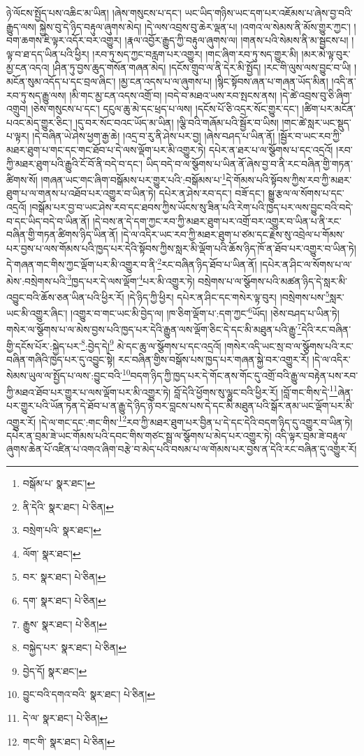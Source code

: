 ཉེ་ལོངས་སྤྱོད་པས་འཆིང་མ་ཡིན། །ཞེས་གསུངས་པ་དང་། ཡང་ཡིད་གཉིས་ཡང་དག་པར་འཇོམས་པ་ཞེས་བྱ་བའི་རྒྱུད་ལས། སྐྱེས་བུ་དེ་ཉིད་བརྟུལ་ཞུགས་མེད། །དེ་ལས་འབྲས་བུ་ཆེར་ལྡན་པ། །འགའ་ལ་སེམས་ནི་མོས་གྱུར་ཀྱང་། །བག་ཆགས་ཇི་ལྟར་འདོར་བར་འགྱུར། །རྣལ་འབྱོར་རྒྱུད་ཀྱི་བརྟུལ་ཞུགས་ལ། །གནས་པའི་སེམས་ནི་མ་སྦྱངས་པ། །ལྟ་བ་ཐ་དད་ཡིན་པའི་ཕྱིར། །རབ་ཏུ་སད་ཀྱང་བརླག་པར་འགྱུར། །གང་ཞིག་རབ་ཏུ་སད་གྱུར་མི། །མར་མེ་ལྟ་བུར་མྱ་ངན་འདའ། །ཤིན་ཏུ་བྱས་ཆུད་གསོན་གཞན་མེད། །དངོས་གྲུབ་ལ་ནི་དེར་མི་སྤྱོད། །རང་གི་ལུས་ལས་བྱུང་བ་ཡི། །མངོན་སུམ་འདོད་པ་དང་བྲལ་ཞིང་། །མྱ་ངན་འདས་པ་ལ་ཞུགས་པ། །སྙིང་སྟོབས་ཞན་པ་གཞན་ཡོད་མིན། །འདི་ན་རབ་ཏུ་སད་རྒྱུ་ལས། །མི་གང་མྱ་ངན་འདས་འགྲོ་བ། །བདེ་བ་མཐའ་ཡས་རབ་སྤངས་ནས། །དེ་ཚེ་འབྲས་བུ་ཅི་ཞིག་འགྲུབ། །ཅེས་གསུངས་པ་དང་། དངུལ་ཆུ་མེ་དང་ཕྲད་པ་ལས། །དངོས་པོ་ཅི་འདྲར་སོང་གྱུར་དང་། །ཚིག་པར་མངོན་པའང་མེད་གྱུར་ཅིང་། །དུ་བར་སོང་བའང་ཡོད་མ་ཡིན། །ལྕི་བའི་གཞོམ་པའི་སྦྱོར་བ་ཡིས། །གང་ཚེ་སླར་ཡང་སྡུད་པ་ལྟར། །དེ་བཞིན་ཡེ་ཤེས་ཕྱག་རྒྱ་ཆེ། །འདྲ་བ་རུ་ནི་ཤེས་པར་བྱ། །ཞེས་བཤད་པ་ཡིན་ནོ། །སྦྱོར་བ་ཡང་རབ་ཀྱི་མཐར་ཐུག་པ་གང་དང་གང་ཐོབ་པ་དེ་ལས་ལྡོག་པར་མི་འགྱུར་ཏེ། དཔེར་ན་ཐར་པ་ལ་སྩོགས་པ་དང་འདྲའོ། །རབ་ཀྱི་མཐར་ཐུག་པའི་རྒྱུའི་ངོ་བོ་ནི་བདེ་བ་དང་། ཡིད་བདེ་བ་ལ་སྩོགས་པ་ཡིན་ནོ་ཞེས་བྱ་བ་ནི་རང་བཞིན་གྱི་གཏན་ཚིགས་སོ། །གཞན་ཡང་གང་ཞིག་བསྒོམས་པར་གྱུར་པའི་:བསྒོམས་པ་\footnote{བསྒོམ་པ་  སྣར་ཐང་། }དེ་གོམས་པའི་སྟོབས་ཀྱིས་རབ་ཀྱི་མཐར་ཐུག་པ་ལ་གནས་པ་འཐོབ་པར་འགྱུར་བ་ཡིན་ཏེ། དཔེར་ན་ཤེས་རབ་དང་། བཟོ་དང་། སྒྱུ་རྩལ་ལ་སོགས་པ་དང་འདྲའོ། །བསྒོམ་པར་བྱ་བ་ཡང་ཤེས་རབ་དང་ཐབས་ཀྱིས་ཡོངས་སུ་ཟིན་པའི་རེག་པའི་ཁྱད་པར་ལས་བྱུང་བའི་བདེ་བ་དང་ཡིད་བདེ་བ་ཡིན་ནོ། །དེ་བས་ན་དེ་དག་ཀྱང་རབ་ཀྱི་མཐར་ཐུག་པར་འགྲོ་བར་འགྱུར་བ་ཡིན་པ་ནི་རང་བཞིན་གྱི་གཏན་ཚིགས་ཉིད་ཡིན་ནོ། །དེ་ལ་འདིར་ཡང་རབ་ཀྱི་མཐར་ཐུག་པ་ཙམ་དང་རྗེས་སུ་འབྲེལ་པ་གོམས་པར་བྱས་པ་ལས་གོམས་པའི་ཁྱད་པར་དེའི་སྟོབས་ཀྱིས་སླར་མི་ལྡོག་པའི་ཆོས་ཉིད་ཁོ་ན་ཐོབ་པར་འགྱུར་བ་ཡིན་ཏེ། དེ་གཞན་གང་གིས་ཀྱང་ལྡོག་པར་མི་འགྱུར་བ་ནི་\footnote{ནི་དེའི་  སྣར་ཐང་།  པེ་ཅིན། }རང་བཞིན་ཉིད་ཐོབ་པ་ཡིན་ནོ། །དཔེར་ན་ཤིང་ལ་སོགས་པ་ལ་མེས་:བསྲེགས་པའི་\footnote{བསྲེག་པའི་  སྣར་ཐང་། }ཁྱད་པར་དེ་ལས་ལྡོག་\footnote{ལོག་  སྣར་ཐང་། }པར་མི་འགྱུར་ཏེ། བསྲེགས་པ་ལ་སྩོགས་པའི་མཚན་ཉིད་དེ་སླར་མི་འབྱུང་བའི་ཆོས་ཅན་ཡིན་པའི་ཕྱིར་རོ། །དེ་ཉིད་ཀྱི་ཕྱིར། དཔེར་ན་ཤིང་དང་གསེར་ལྟ་བུར། །བསྲེགས་པས་\footnote{བར་  སྣར་ཐང་།  པེ་ཅིན། }སླར་ཡང་མི་འགྱུར་ཞིང་། །འགྱུར་བ་གང་ཡང་མི་བྱེད་ལ། །ཁ་ཅིག་ལྡོག་པ་:དག་ཀྱང་\footnote{དག་  སྣར་ཐང་།  པེ་ཅིན། }ཡོད། །ཅེས་བཤད་པ་ཡིན་ཏེ། གསེར་ལ་སྩོགས་པ་ལ་མེས་བྱས་པའི་ཁྱད་པར་དེའི་རྒྱུན་ལས་ལྡོག་ཅིང་དེ་དང་མི་མཐུན་པའི་རྒྱུ་\footnote{རྒྱུས་  སྣར་ཐང་།  པེ་ཅིན། }དེའི་རང་བཞིན་གྱི་དངོས་པོར་:སྐྱེད་པར་\footnote{བསྐྱེད་པར་  སྣར་ཐང་།  པེ་ཅིན། }:བྱེད་དེ།\footnote{བྱེད་དོ།  སྣར་ཐང་། } མེ་དང་ཆུ་ལ་སྩོགས་པ་དང་འདྲའོ། །གསེར་འདི་ཡང་སྲ་བ་ལ་སྩོགས་པའི་རང་བཞིན་གཞིའི་ཁྱད་པར་དུ་འབྱུང་སྟེ། རང་བཞིན་གྱིས་བསྒོས་པས་ཁྱད་པར་གཞན་སྐྱེ་བར་འགྱུར་རོ། །དེ་ལ་འདིར་སེམས་ཡུལ་ལ་སྤྱོད་པ་ལས་:བྱུང་བའི་\footnote{བྱུང་བའི་དགའ་བའི་  སྣར་ཐང་།  པེ་ཅིན། }བདག་ཉིད་ཀྱི་ཁྱད་པར་དེ་གོང་ནས་གོང་དུ་འགྲོ་བའི་རྒྱུ་ལ་བརྟེན་པས་རབ་ཀྱི་མཐའ་ཐོབ་པར་གྱུར་པ་ལས་ལྡོག་པར་མི་འགྱུར་ཏེ། བློ་དེའི་ཕྱོགས་སུ་ལྷུང་བའི་ཕྱིར་རོ། །བློ་གང་གིས་དེ་\footnote{དེ་ལ་  སྣར་ཐང་།  པེ་ཅིན། }ཞེན་པར་གྱུར་པའི་ཡོན་ཏན་དེ་ཐོབ་པ་ན་རྒྱུ་དེ་ཉིད་ཉེ་བར་བླངས་པས་དེ་དང་མི་མཐུན་པའི་སྒོར་ནམ་ཡང་ལྡོག་པར་མི་འགྱུར་རོ། །དེ་ལ་གང་དང་:གང་གིས་\footnote{གང་གི་  སྣར་ཐང་།  པེ་ཅིན། }རབ་ཀྱི་མཐར་ཐུག་པར་བྱིན་པ་དེ་དང་དེའི་བདག་ཉིད་དུ་འགྱུར་བ་ཡིན་ཏེ། དཔེར་ན་བྲམ་ཟེ་ཡང་གོམས་པའི་དབང་གིས་གཙང་སྦྲ་ལ་སྩོགས་པ་མེད་པར་འགྱུར་ཏེ། འདི་ལྟར་བྲམ་ཟེ་བརྟུལ་ཞུགས་ཆེན་པོ་འཛིན་པ་འགའ་ཞིག་བརྩེ་བ་མེད་པའི་བསམ་པ་ལ་གོམས་པར་བྱས་ན་དེའི་རང་བཞིན་དུ་འགྱུར་རོ། 